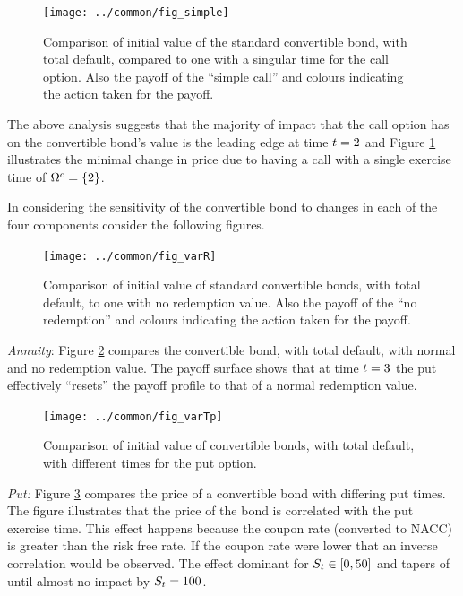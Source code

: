 \documentclass[a4paper,11pt,oneside]{report}
\theoremstyle{plain}
\theoremstyle{definition}
\begin{document}
\begin{figure}[htb!]
 \centering
 \texttt{[image: ../common/fig\_simple]}
 \caption[Simple Call]{Comparison of initial value of the standard convertible bond, with total default, compared to one with a singular time for the call option.  Also the payoff of the ``simple call'' and colours indicating the action taken for the payoff.}
 \label{fig:simple}
\end{figure}\FloatBarrier

The above analysis suggests that the majority of impact that the call option has on the convertible bond's value is the leading edge at time $\t = 2$ and Figure \ref{fig:simple} illustrates the minimal change in price due to having a call with a single exercise time of $\Tc = \{2\}$.

In considering the sensitivity of the convertible bond to changes in each of the four components consider the following figures.

\begin{figure}[htb!]
 \centering
 \texttt{[image: ../common/fig\_varR]}
 \caption[Varying Redemption Value]{Comparison of initial value of standard convertible bonds, with total default, to one with no redemption value.  Also the payoff of the ``no redemption'' and colours indicating the action taken for the payoff.}
 \label{fig:varR}
\end{figure}

\emph{Annuity}: Figure \ref{fig:varR} compares the convertible bond, with total default, with normal and no redemption value.  The payoff surface shows that at time $\t = 3$ the put effectively ``resets'' the payoff profile to that of a normal redemption value.

\begin{figure}[htb!]
 \centering
 \texttt{[image: ../common/fig\_varTp]}
 \caption[Varying Put Time]{Comparison of initial value of convertible bonds, with total default, with different times for the put option.}
 \label{fig:varTp}
\end{figure}

\emph{Put:} Figure \ref{fig:varTp} compares the price of a convertible bond with differing put times.  The figure illustrates that the price of the bond is correlated with the put exercise time.  This effect happens because the coupon rate (converted to NACC) is greater than the risk free rate.  If the coupon rate were lower that an inverse correlation would be observed.  The effect dominant for $\S \in [0, 50]$ and tapers of until almost no impact by $\S = 100$.
\end{document}

